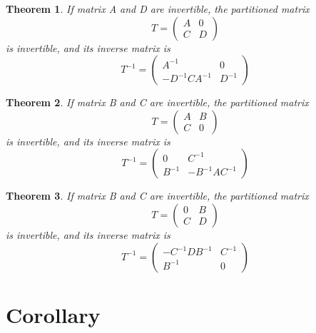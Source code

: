 \documentclass{article}
\newtheorem{theorem}{Theorem}
\begin{document}
    \begin{theorem}
        If matrix A and D are invertible, the partitioned matrix
        $$
            T =
            \begin{pmatrix}
                A & 0 \\
                C & D
            \end{pmatrix}
        $$
        is invertible, and its inverse matrix is
        $$
            T^{-1} =
            \begin{pmatrix}
                A^{-1} & 0 \\
                -D^{-1} C A^{-1} & D^{-1}
            \end{pmatrix}
        $$
    \end{theorem}

    \begin{theorem}
        If matrix B and C are invertible, the partitioned matrix
        $$
            T =
            \begin{pmatrix}
                A & B \\
                C & 0
            \end{pmatrix}
        $$
        is invertible, and its inverse matrix is
        $$
            T^{-1} =
            \begin{pmatrix}
                0 & C^{-1} \\
                B^{-1} & -B^{-1} A C^{-1}
            \end{pmatrix}
        $$
    \end{theorem}

    \begin{theorem}
        If matrix B and C are invertible, the partitioned matrix
        $$
            T =
            \begin{pmatrix}
                0 & B \\
                C & D
            \end{pmatrix}
        $$
        is invertible, and its inverse matrix is
        $$
            T^{-1} =
            \begin{pmatrix}
                -C^{-1} D B^{-1} & C^{-1} \\
                B^{-1}  & 0
            \end{pmatrix}
        $$
    \end{theorem}

\section{Corollary}
\end{document}
